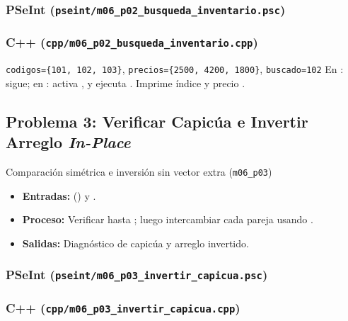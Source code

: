 \documentclass[11pt,letterpaper]{article}
\begin{document}
\subsubsection*{PSeInt (\texttt{pseint/m06\_p02\_busqueda\_inventario.psc})}


\subsubsection*{C++ (\texttt{cpp/m06\_p02\_busqueda\_inventario.cpp})}


\begin{pruebaescritorio}{\texttt{codigos=\{101, 102, 103\}}, \texttt{precios=\{2500, 4200, 1800\}}, \texttt{buscado=102}}
En :  sigue; en :  activa ,  y ejecuta . Imprime índice  y precio .
\end{pruebaescritorio}

\subsection{Problema 3: Verificar Capicúa e Invertir Arreglo \emph{In-Place}}
\begin{analisis}{Comparación simétrica e inversión sin vector extra (\texttt{m06\_p03})}
\begin{itemize}
  \item \textbf{Entradas:}  () y .
  \item \textbf{Proceso:} Verificar  hasta ; luego intercambiar cada pareja usando .
  \item \textbf{Salidas:} Diagnóstico de capicúa y arreglo invertido.
\end{itemize}
\end{analisis}

\subsubsection*{PSeInt (\texttt{pseint/m06\_p03\_invertir\_capicua.psc})}


\subsubsection*{C++ (\texttt{cpp/m06\_p03\_invertir\_capicua.cpp})}

\end{document}
